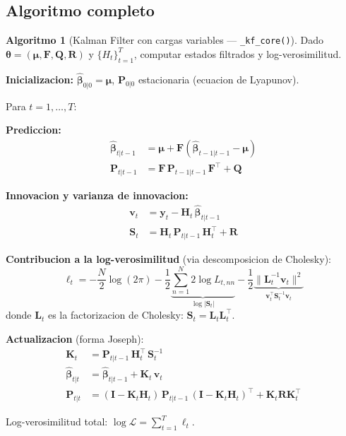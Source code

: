 \documentclass[12pt, a4paper]{article}
\theoremstyle{plain}
\theoremstyle{definition}
\newtheorem{algoritmo}{Algoritmo}[section]
\theoremstyle{remark}
\newcommand{\bbet}{\bm{\beta}}
\newcommand{\bmu}{\bm{\mu}}
\newcommand{\by}{\mathbf{y}}
\newcommand{\bH}{\mathbf{H}}
\newcommand{\bF}{\mathbf{F}}
\newcommand{\bQ}{\mathbf{Q}}
\newcommand{\bR}{\mathbf{R}}
\newcommand{\bI}{\mathbf{I}}
\newcommand{\bP}{\mathbf{P}}
\newcommand{\bK}{\mathbf{K}}
\newcommand{\bS}{\mathbf{S}}
\newcommand{\bL}{\mathbf{L}}
\newcommand{\bv}{\mathbf{v}}
\begin{document}
\subsection{Algoritmo completo}

\begin{algoritmo}[Kalman Filter con cargas variables --- \texttt{\_kf\_core()}]
\label{alg:kf}
Dado $\bm{\theta} = (\bmu, \bF, \bQ, \bR)$ y $\{H_t\}_{t=1}^T$,
computar estados filtrados y log-verosimilitud.

\textbf{Inicializacion:} $\hat{\bbet}_{0|0} = \bmu$,
$\bP_{0|0}$ estacionaria (ecuacion de Lyapunov).

Para $t = 1, \ldots, T$:

\textbf{Prediccion:}
\begin{align}
  \hat{\bbet}_{t|t-1} &= \bmu + \bF\!\left(\hat{\bbet}_{t-1|t-1} - \bmu\right)
  \label{eq:pred_state} \\
  \bP_{t|t-1} &= \bF\,\bP_{t-1|t-1}\,\bF^\top + \bQ
  \label{eq:pred_cov}
\end{align}

\textbf{Innovacion y varianza de innovacion:}
\begin{align}
  \bv_t &= \by_t - \bH_t\,\hat{\bbet}_{t|t-1}
  \label{eq:innov} \\
  \bS_t &= \bH_t\,\bP_{t|t-1}\,\bH_t^\top + \bR
  \label{eq:innov_cov}
\end{align}

\textbf{Contribucion a la log-verosimilitud} (via descomposicion de Cholesky):
\begin{equation}
  \ell_t = -\frac{N}{2}\log(2\pi)
           - \frac{1}{2}\!\underbrace{\sum_{n=1}^N 2\log L_{t,nn}}_{\log|\bS_t|}
           - \frac{1}{2}\underbrace{\|\bL_t^{-1}\bv_t\|^2}_{\bv_t^\top \bS_t^{-1}\bv_t}
  \label{eq:loglik_t}
\end{equation}
donde $\bL_t$ es la factorizacion de Cholesky: $\bS_t = \bL_t\bL_t^\top$.

\textbf{Actualizacion} (forma Joseph):
\begin{align}
  \bK_t &= \bP_{t|t-1}\,\bH_t^\top\,\bS_t^{-1}
  \label{eq:gain} \\
  \hat{\bbet}_{t|t} &= \hat{\bbet}_{t|t-1} + \bK_t\,\bv_t
  \label{eq:update_state} \\
  \bP_{t|t} &= (\bI - \bK_t\bH_t)\,\bP_{t|t-1}\,(\bI - \bK_t\bH_t)^\top
               + \bK_t\bR\bK_t^\top
  \label{eq:joseph}
\end{align}

Log-verosimilitud total: $\log\mathcal{L} = \sum_{t=1}^T \ell_t$.
\end{algoritmo}
\end{document}
